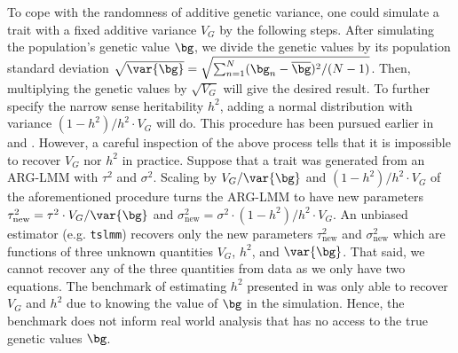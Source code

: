 To cope with the randomness of additive genetic variance, one could simulate a trait with a fixed additive variance $V_G$  by the following steps.
After simulating the population's genetic value $\bg$, we divide the genetic values by its population standard deviation $\sqrt{\var{\bg}} = \sqrt{\sum_{n=1}^N (\bg_n - \overline{\bg})^2 / (N-1)}$.
Then, multiplying the genetic values by $\sqrt{V_G}$ will give the desired result.
To further specify the narrow sense heritability $h^2$, adding a normal distribution with variance $(1-h^2)/h^2 \cdot V_G$ will do. 
This procedure has been pursued earlier in \cite{zhang2021biobank} and \cite{tagami2024tstrait}.
However, a careful inspection of the above process tells that it is impossible to recover $V_G$ nor $h^2$ in practice.
Suppose that a trait was generated from an ARG-LMM with $\tau^2$ and $\sigma^2$. 
Scaling by $V_G / \var{\bg}$ and $(1-h^2)/h^2 \cdot V_G$ of the aforementioned procedure turns the ARG-LMM to have new parameters $\tau^{2}_{\textrm{new}} = \tau^2 \cdot V_G / \var{\bg}$ and $\sigma^{2}_{\textrm{new}} = \sigma^2 \cdot (1-h^2)/h^2 \cdot V_G$.
An unbiased estimator (e.g. \texttt{tslmm}) recovers only the new parameters $\tau^2_{\textrm{new}}$ and $\sigma^2_{\textrm{new}}$ which are functions of three unknown quantities $V_G$, $h^2$, and $\var{\bg}$.
That said, we cannot recover any of the three quantities from data as we only have two equations.
The benchmark of estimating $h^2$ presented in \cite{zhang2021biobank} was only able to recover $V_G$ and $h^2$ due to knowing the value of $\bg$ in the simulation.
Hence, the benchmark does not inform real world analysis that has no access to the true genetic values $\bg$.


